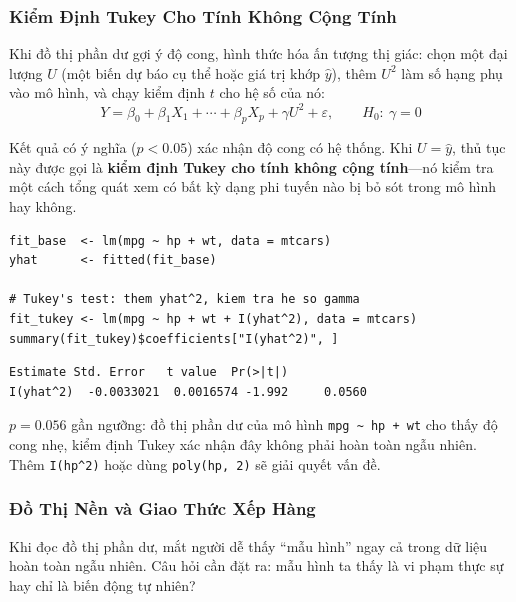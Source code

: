 \documentclass[12pt, a4paper]{article}
\begin{document}
\subsubsection{Kiểm Định Tukey Cho Tính Không Cộng Tính}

Khi đồ thị phần dư gợi ý độ cong, hình thức hóa ấn tượng thị giác: chọn một đại lượng $U$ (một biến dự báo cụ thể hoặc giá trị khớp $\hat{y}$), thêm $U^2$ làm số hạng phụ vào mô hình, và chạy kiểm định $t$ cho hệ số của nó:
\[
  Y = \beta_0 + \beta_1 X_1 + \cdots + \beta_p X_p + \gamma U^2 + \varepsilon,
  \qquad H_0{:}\ \gamma = 0
\]

Kết quả có ý nghĩa ($p < 0.05$) xác nhận độ cong có hệ thống. Khi $U = \hat{y}$, thủ tục này được gọi là \textbf{kiểm định Tukey cho tính không cộng tính}---nó kiểm tra một cách tổng quát xem có bất kỳ dạng phi tuyến nào bị bỏ sót trong mô hình hay không.

\begin{lstlisting}[style=Rstyle]
fit_base  <- lm(mpg ~ hp + wt, data = mtcars)
yhat      <- fitted(fit_base)

# Tukey's test: them yhat^2, kiem tra he so gamma
fit_tukey <- lm(mpg ~ hp + wt + I(yhat^2), data = mtcars)
summary(fit_tukey)$coefficients["I(yhat^2)", ]
\end{lstlisting}

\begin{lstlisting}[style=output]
              Estimate Std. Error   t value  Pr(>|t|)
I(yhat^2)  -0.0033021  0.0016574 -1.992     0.0560
\end{lstlisting}

$p = 0.056$ gần ngưỡng: đồ thị phần dư của mô hình \texttt{mpg \textasciitilde{} hp + wt} cho thấy độ cong nhẹ, kiểm định Tukey xác nhận đây không phải hoàn toàn ngẫu nhiên. Thêm \texttt{I(hp\^{}2)} hoặc dùng \texttt{poly(hp, 2)} sẽ giải quyết vấn đề.

\subsubsection{Đồ Thị Nền và Giao Thức Xếp Hàng}

Khi đọc đồ thị phần dư, mắt người dễ thấy ``mẫu hình'' ngay cả trong dữ liệu hoàn toàn ngẫu nhiên. Câu hỏi cần đặt ra: mẫu hình ta thấy là vi phạm thực sự hay chỉ là biến động tự nhiên?
\end{document}
